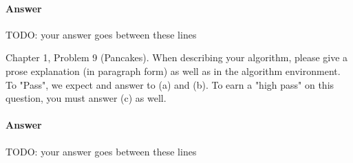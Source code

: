 \documentclass{article}
\begin{document}
\paragraph{Answer}


TODO: your answer goes between these lines



\nextprob
{}

Chapter 1, Problem 9 (Pancakes). When describing your algorithm, please give a
prose explanation (in paragraph form) as well as in the algorithm environment.
To "Pass", we expect and answer to (a) and (b).  To earn a "high pass" on this
question, you must answer (c) as well.

\paragraph{Answer}


TODO: your answer goes between these lines

\end{document}
